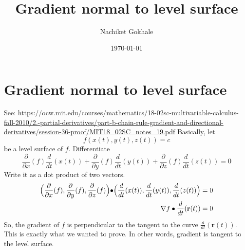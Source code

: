 \documentclass{article}
\newcommand{\beq}{\begin{equation}}
\newcommand{\eeq}{\end{equation}}
\newcommand{\ber}{\begin{eqnarray}}
\newcommand{\eer}{\end{eqnarray}}
\newcommand{\dd}[2]{\frac{d}{d{#2}}{(#1)} }
\newcommand{\pdd}[2]{\frac{\partial}{\partial{#2}}{(#1)} }
\begin{document}
\title{Gradient normal to level surface}
\author{Nachiket Gokhale}
\date{\today}
\maketitle
\section{Gradient normal to level surface}
See: \url{https://ocw.mit.edu/courses/mathematics/18-02sc-multivariable-calculus-fall-2010/2.-partial-derivatives/part-b-chain-rule-gradient-and-directional-derivatives/session-36-proof/MIT18_02SC_notes_19.pdf} Basically, let 
\beq
f(x(t),y(t),z(t)) = c
\eeq
be a level surface of $f$. Differentiate
\beq
\pdd{f}{x}\dd{x(t)}{t} + \pdd{f}{y}\dd{y(t)}{t} + \pdd{f}{z}\dd{z(t)}{t} = 0
\eeq
Write it as a dot product of two vectors.
\ber
\Big{(}\pdd{f}{x},\pdd{f}{y},\pdd{f}{z}\Big{)}{\bullet}\Big{(}\dd{x(t)}{t},\dd{y(t)}{t},\dd{z(t)}{t}\Big{)} = 0\\
\nabla{f}\bullet{\dd{\mathbf{r}(t)}{t}} = 0
\eer
So, the gradient of $f$ is perpendicular to the tangent to the curve $\dd{\mathbf{r}(t)}{t}$. This is exactly what we wanted to prove. In other words, gradient is tangent to the level surface.
\end{document}
